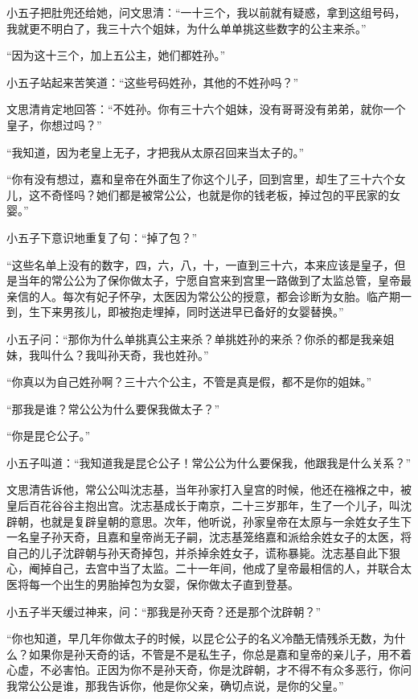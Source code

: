 小五子把肚兜还给她，问文思清：“一十三个，我以前就有疑惑，拿到这组号码，我就更不明白了，我三十六个姐妹，为什么单单挑这些数字的公主来杀。”

“因为这十三个，加上五公主，她们都姓孙。”

小五子站起来苦笑道：“这些号码姓孙，其他的不姓孙吗？”

文思清肯定地回答：“不姓孙。你有三十六个姐妹，没有哥哥没有弟弟，就你一个皇子，你想过吗？”

“我知道，因为老皇上无子，才把我从太原召回来当太子的。”

“你有没有想过，嘉和皇帝在外面生了你这个儿子，回到宫里，却生了三十六个女儿，这不奇怪吗？她们都是被常公公，也就是你的钱老板，掉过包的平民家的女婴。”

小五子下意识地重复了句：“掉了包？”

“这些名单上没有的数字，四，六，八，十，一直到三十六，本来应该是皇子，但是当年的常公公为了保你做太子，宁愿自宫来到宫里一路做到了太监总管，皇帝最亲信的人。每次有妃子怀孕，太医因为常公公的授意，都会诊断为女胎。临产期一到，生下来男孩儿，即被抱走埋掉，同时送进早已备好的女婴替换。”

小五子问：“那你为什么单挑真公主来杀？单挑姓孙的来杀？你杀的都是我亲姐妹，我叫什么？我叫孙天奇，我也姓孙。”

“你真以为自己姓孙啊？三十六个公主，不管是真是假，都不是你的姐妹。”

“那我是谁？常公公为什么要保我做太子？”

“你是昆仑公子。”

小五子叫道：“我知道我是昆仑公子！常公公为什么要保我，他跟我是什么关系？”

文思清告诉他，常公公叫沈志基，当年孙家打入皇宫的时候，他还在襁褓之中，被皇后百花谷谷主抱出宫。沈志基成长于南京，二十三岁那年，生了一个儿子，叫沈辟朝，也就是复辟皇朝的意思。次年，他听说，孙家皇帝在太原与一余姓女子生下一名皇子孙天奇，且嘉和皇帝尚无子嗣，沈志基笼络嘉和派给余姓女子的太医，将自己的儿子沈辟朝与孙天奇掉包，并杀掉余姓女子，谎称暴毙。沈志基自此下狠心，阉掉自己，去宫中当了太监。二十一年间，他成了皇帝最相信的人，并联合太医将每一个出生的男胎掉包为女婴，保你做太子直到登基。

小五子半天缓过神来，问：“那我是孙天奇？还是那个沈辟朝？”

“你也知道，早几年你做太子的时候，以昆仑公子的名义冷酷无情残杀无数，为什么？如果你是孙天奇的话，不管是不是私生子，你总是嘉和皇帝的亲儿子，用不着心虚，不必害怕。正因为你不是孙天奇，你是沈辟朝，才不得不有众多恶行，你问我常公公是谁，那我告诉你，他是你父亲，确切点说，是你的父皇。”

